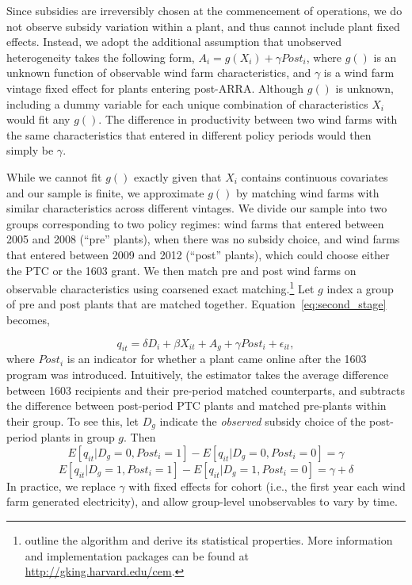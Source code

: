 \documentclass[12pt]{article}
\begin{document}
Since subsidies are irreversibly chosen at the commencement of operations, we do not observe subsidy variation within a plant, and thus cannot include plant fixed effects. Instead, we adopt the additional assumption that unobserved heterogeneity takes the following form, $A_{i}=g(X_{i})+\gamma Post_{i}$, where $g()$ is an unknown function of observable wind farm characteristics, and $\gamma$ is a wind farm vintage fixed effect for plants entering post-ARRA. Although $g()$ is unknown, including a dummy variable for each unique combination of characteristics $X_{i}$ would fit any $g()$. The difference in productivity between two wind farms with the same characteristics that entered in different policy periods would then simply be $\gamma$.

While we cannot fit $g()$ exactly given that $X_{i}$ contains continuous covariates and our sample is finite, we approximate $g()$ by matching wind farms with similar characteristics across different vintages. We divide our sample into two groups corresponding to two policy regimes: wind farms that entered between 2005 and 2008 (``pre'' plants), when there was no subsidy choice, and wind farms that entered between 2009 and 2012 (``post'' plants), which could choose either the PTC or the 1603 grant. We then match pre and post wind farms on observable characteristics using coarsened exact matching.\footnote{\citet{iacus_causal_2012} outline the algorithm and derive its statistical properties. More information and implementation packages can be found at \href{http://gking.harvard.edu/cem}{http://gking.harvard.edu/cem}.} Let $g$ index a group of pre and post plants that are matched together. Equation~\ref{eq:second_stage} becomes, 

\begin{equation}
q_{it}=\delta D_{i}+\beta X_{it}+A_{g}+\gamma Post_{i}+\epsilon_{it}\label{eq:mdd} ,
\end{equation}
where $Post_{i}$ is an indicator for whether a plant came online after the 1603 program was introduced. Intuitively, the estimator takes the average difference between 1603 recipients and their pre-period matched counterparts, and subtracts the difference between post-period PTC plants and matched pre-plants within their group. To see this, let $D_{g}$ indicate the \emph{observed} subsidy choice of the post-period plants in group $g$. Then
\[
E[q_{it}|D_{g}=0,Post_{i}=1]-E[q_{it}|D_{g}=0,Post_{i}=0]=\gamma
\]
\[
E[q_{it}|D_{g}=1,Post_{i}=1]-E[q_{it}|D_{g}=1,Post_{i}=0]=\gamma+\delta
\]
In practice, we replace $\gamma$ with fixed effects for cohort (i.e., the first year each wind farm generated electricity), and allow group-level unobservables to vary by time.
\end{document}
